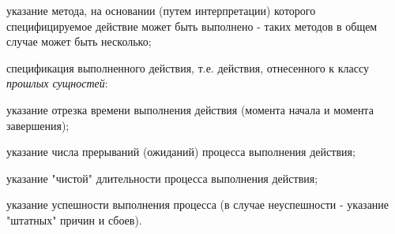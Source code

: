 \begin{SCn}
{\begin{scnitemize}
\begin{scnitemizeii}
\end{scnitemizeii}
\item указание метода, на основании (путем интерпретации) которого специфицируемое действие может быть выполнено - таких методов в общем случае может быть несколько;
\item спецификация выполненного действия, т.е. действия, отнесенного к классу \textit{прошлых сущностей}:
\begin{scnitemizeii}
\item указание отрезка времени выполнения действия (момента начала и момента завершения);
\item указание числа прерываний (ожиданий) процесса выполнения действия;
\item указание "чистой"{} длительности процесса выполнения действия;
\item указание успешности выполнения процесса (в случае неуспешности - указание "штатных"{} причин и сбоев).
\end{scnitemizeii}
\end{scnitemize}}


\bigskip
{}


\end{SCn}

